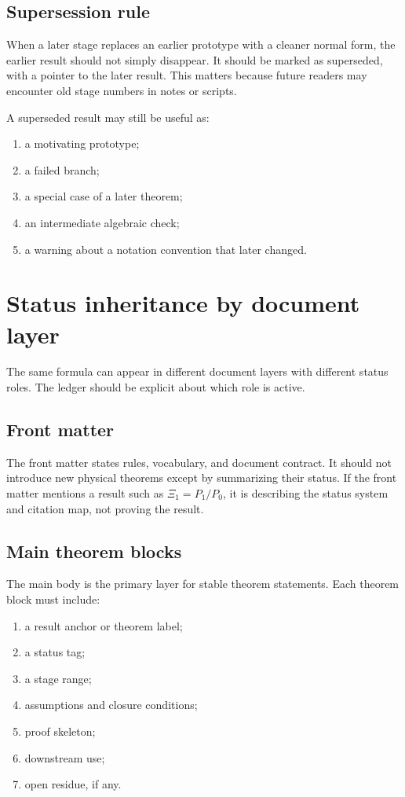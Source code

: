 \subsection{Supersession rule}
\label{subsec:supersession-rule}

When a later stage replaces an earlier prototype with a cleaner normal form, the earlier result should not simply disappear.  It should be marked as superseded, with a pointer to the later result.  This matters because future readers may encounter old stage numbers in notes or scripts.

A superseded result may still be useful as:
\begin{enumerate}[leftmargin=2.2em]
  \item a motivating prototype;
  \item a failed branch;
  \item a special case of a later theorem;
  \item an intermediate algebraic check;
  \item a warning about a notation convention that later changed.
\end{enumerate}

\section{Status inheritance by document layer}
\label{sec:status-inheritance-layer}

The same formula can appear in different document layers with different status roles.  The ledger should be explicit about which role is active.

\subsection{Front matter}
\label{subsec:frontmatter-status-role}

The front matter states rules, vocabulary, and document contract.  It should not introduce new physical theorems except by summarizing their status.  If the front matter mentions a result such as \(\Xi_1=P_1/P_0\), it is describing the status system and citation map, not proving the result.

\subsection{Main theorem blocks}
\label{subsec:main-theorem-block-status-role}

The main body is the primary layer for stable theorem statements.  Each theorem block must include:
\begin{enumerate}[leftmargin=2.2em]
  \item a result anchor or theorem label;
  \item a status tag;
  \item a stage range;
  \item assumptions and closure conditions;
  \item proof skeleton;
  \item downstream use;
  \item open residue, if any.
\end{enumerate}

